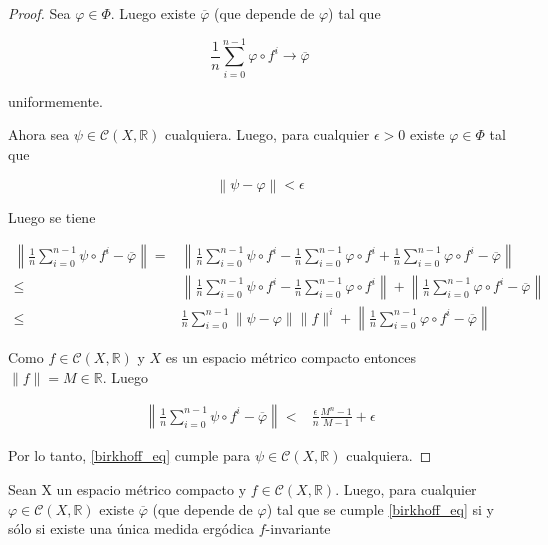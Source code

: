 \begin{proof}
	Sea $\varphi \in \Phi$. Luego existe $\overline{\varphi}$ (que depende de $\varphi$) tal que
	
	\begin{equation}
		\frac{1}{n} \sum_{i=0}^{n-1} \varphi \circ f^i \rightarrow \overline{\varphi}
	\end{equation}
	
	uniformemente.
	
	Ahora sea $\psi \in \mathcal{C}(X,\mathbb{R})$ cualquiera. Luego, para cualquier $\epsilon>0$ existe $\varphi \in \Phi$ tal que
	
	\begin{equation}
		\left\| \psi - \varphi \right\| < \epsilon
	\end{equation}
	
	Luego se tiene
	
	\begin{align}
		\left\| \frac{1}{n} \sum_{i=0}^{n-1} \psi \circ f^i - \overline{\varphi} \right\| =& \left\| \frac{1}{n} \sum_{i=0}^{n-1} \psi \circ f^i - \frac{1}{n} \sum_{i=0}^{n-1} \varphi \circ f^i + \frac{1}{n} \sum_{i=0}^{n-1} \varphi \circ f^i - \overline{\varphi} \right\|\\		
		\leq & \left\| \frac{1}{n} \sum_{i=0}^{n-1} \psi \circ f^i - \frac{1}{n} \sum_{i=0}^{n-1} \varphi \circ f^i \right\| + \left\| \frac{1}{n} \sum_{i=0}^{n-1} \varphi \circ f^i - \overline{\varphi} \right\|\\
		\leq & \frac{1}{n} \sum_{i=0}^{n-1} \| \psi - \varphi \| \| f \|^i + \left\| \frac{1}{n} \sum_{i=0}^{n-1} \varphi \circ f^i - \overline{\varphi} \right\|
	\end{align}
	
	Como $f \in \mathcal{C}(X,\mathbb{R})$ y $X$ es un espacio métrico compacto entonces \mbox{$\|f\|=M \in \mathbb{R}$}. Luego
	
	\begin{align}
		\left\| \frac{1}{n} \sum_{i=0}^{n-1} \psi \circ f^i - \overline{\varphi} \right\| < & \frac{\epsilon}{n} \frac{M^n-1}{M-1} + \epsilon
	\end{align}
	
	Por lo tanto, \eqref{birkhoff_eq} cumple para $\psi \in \mathcal{C}(X,\mathbb{R})$ cualquiera.
\end{proof}

\begin{lema}\label{lema_varphi_continua}
	Sean X un espacio métrico compacto y $f \in \mathcal{C}(X,\mathbb{R})$. Luego, para cualquier $\varphi \in \mathcal{C}(X,\mathbb{R})$ existe $\overline{\varphi}$ (que depende de $\varphi$) tal que se cumple \eqref{birkhoff_eq} si y sólo si existe una única medida ergódica $f$-invariante
\end{lema}

